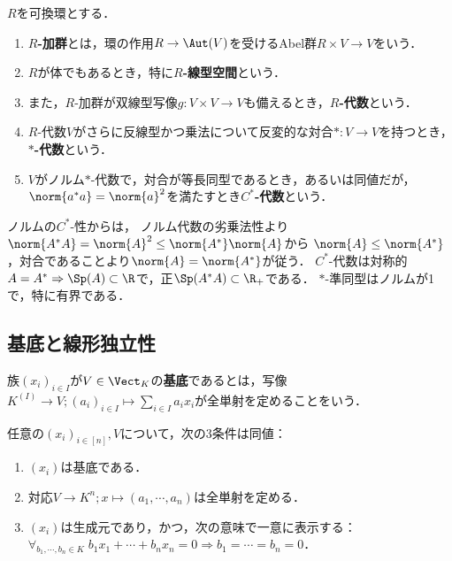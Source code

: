 \documentclass[uplatex, dvipdfmx]{jsreport}
\begin{document}
\begin{definition}
    $R$を可換環とする．
    \begin{enumerate}
        \item \textbf{$R$-加群}とは，環の作用$R\to\Aut(V)$を受けるAbel群$R\times V\to V$をいう．
        \item $R$が体でもあるとき，特に\textbf{$R$-線型空間}という．
        \item また，$R$-加群が双線型写像$g:V\times V\to V$も備えるとき，\textbf{$R$-代数}という．
        \item $R$-代数$V$がさらに反線型かつ乗法について反変的な対合$*:V\to V$を持つとき，\textbf{$*$-代数}という．
        \item $V$がノルム$*$-代数で，対合が等長同型であるとき，あるいは同値だが，$\norm{a^*a}=\norm{a}^2$を満たすとき\textbf{$C^*$-代数}という．
    \end{enumerate}
\end{definition}
\begin{remarks}
    ノルムの$C^*$-性からは，
    ノルム代数の劣乗法性より$\norm{A^*A}=\norm{A}^2\le\norm{A^*}\norm{A}$から
    $\norm{A}\le\norm{A^*}$，対合であることより$\norm{A}=\norm{A^*}$が従う．
    $C^*$-代数は対称的$A=A^*\Rightarrow\Sp(A)\subset\R$で，正$\Sp(A^*A)\subset\R_+$である．
    $*$-準同型はノルムが1で，特に有界である．
\end{remarks}

\subsection{基底と線形独立性}

\begin{definition}[basis]\mbox{}
    族$(x_i)_{i\in I}$が$V\in\Vect_K$の\textbf{基底}であるとは，写像$K^{(I)}\to V;(a_i)_{i\in I}\mapsto\sum_{i\in I}a_ix_i$が全単射を定めることをいう．
\end{definition}
\begin{proposition}[基底の特徴付け]
    任意の$(x_i)_{i\in[n]},V$について，次の3条件は同値：
    \begin{enumerate}
        \item $(x_i)$は基底である．
        \item 対応$V\to K^n;x\mapsto(a_1,\cdots,a_n)$は全単射を定める．
        \item $(x_i)$は生成元であり，かつ，次の意味で一意に表示する：$\forall_{b_1,\cdots,b_n\in K}\;b_1x_1+\cdots+b_nx_n=0\Rightarrow b_1=\cdots=b_n=0$．
    \end{enumerate}
\end{proposition}
\end{document}
